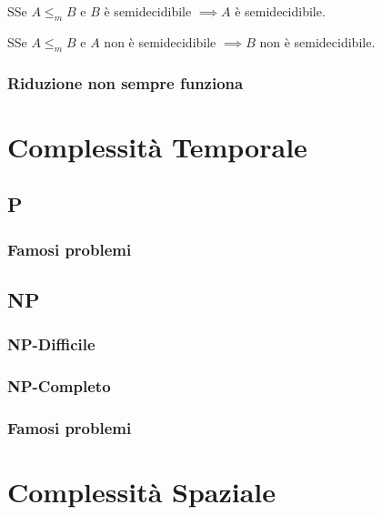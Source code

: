 \documentclass{article}  %
\theoremstyle{definition}
\begin{document}
\begin{theorem}{3.3}
  SSe $A \leq_m B$ e $B$ è semidecidibile $\implies A$ è semidecidibile. 
\end{theorem}
\begin{theorem}{3.4}
  SSe $A \leq_m B$ e $A$ non è semidecidibile $\implies B$ non è semidecidibile. 
\end{theorem}
\subsubsection{Riduzione non sempre funziona}

\section{Complessità Temporale}
\subsection{P}
\subsubsection{Famosi problemi}
\subsection{NP}
\subsubsection{NP-Difficile}
\subsubsection{NP-Completo}
\subsubsection{Famosi problemi}
\section{Complessità Spaziale}
\end{document}

